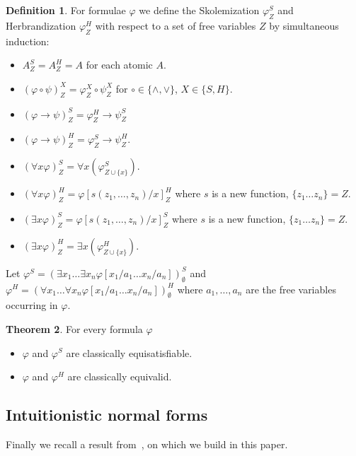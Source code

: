 \documentclass{easychair}
\theoremstyle{definition}
\newtheorem{theorem}{Theorem}[section]
\theoremstyle{definition}
\theoremstyle{definition}
\theoremstyle{definition}
\theoremstyle{definition}
\newtheorem{definition}[theorem]{Definition}
\theoremstyle{definition}
\theoremstyle{definition}
\begin{document}
\begin{definition}\label{definition:skolemization}
	For formulae $\varphi$ we define the Skolemization $\varphi^S_Z$ and Herbrandization $\varphi^H_Z$ with respect to a set of free variables $Z$ by simultaneous induction:
	\begin{itemize}
		\item $A^S_Z = A^H_Z = A$ for each atomic $A$.
		\item $(\varphi\circ\psi)^X_Z = \varphi^X_Z\circ\psi^X_Z$ for $\circ\in\{\wedge, \vee\}$, $X\in\{S, H\}$.
		\item $(\varphi\to\psi)^S_Z = \varphi^H_Z\to \psi^S_Z$
		\item $(\varphi\to\psi)^H_Z = \varphi^S_Z\to\psi^H_Z$.
		\item $\left(\forall x\varphi\right)^S_Z = \forall x\left(\varphi^S_{Z\cup\{x\}}\right)$.
		\item
		$\left(\forall x\varphi\right)^H_Z = \varphi[s(z_1,\dots,z_n)/x]^H_Z$ where $s$ is a new function, $\{z_1\dots z_n\} = Z$.
		\item $\left(\exists x\varphi\right)^S_Z = \varphi[s(z_1,\dots,z_n)/x]^S_Z$ where $s$ is a new function, $\{z_1\dots z_n\} = Z$.
		\item $\left(\exists x\varphi\right)^H_Z = \exists x\left(\varphi^H_{Z\cup\{x\}}\right)$.
	\end{itemize}
	Let $\varphi^S = (\exists x_1\dots\exists x_n \varphi[x_1/a_1\dots x_n/a_n])^S_\emptyset$ and $\varphi^H = (\forall x_1\dots\forall x_n \varphi[x_1/a_1\dots x_n/a_n])^H_\emptyset$ where $a_1,\dots,a_n$ are the free variables occurring in $\varphi$.
\end{definition}

\begin{theorem}
	\label{thm:herbrand-skolem}
	For every formula $\varphi$
	\begin{itemize}
		\item $\varphi$ and $\varphi^S$ are classically equisatisfiable.
		\item $\varphi$ and $\varphi^H$ are classically equivalid.
	\end{itemize}
\end{theorem}


\subsection{Intuitionistic normal forms}

Finally we recall a result from~\cite{claessen2015sat}, on which we build in this paper.
\end{document}
